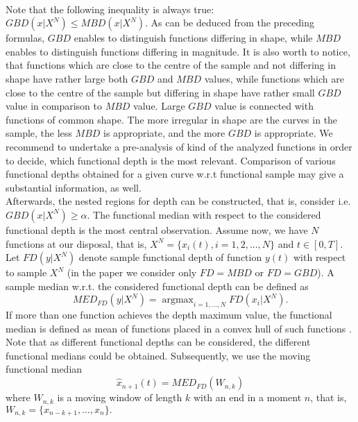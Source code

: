 \documentclass[12pt,a4paper]{article}
\numberwithin{equation}{section}
\begin{document}
\\ Note that the following inequality is always true: $GBD(x|X^N)\leq MBD(x|X^N)$. As can be deduced from the preceding formulas, $GBD$ enables to distinguish functions differing in shape, while $MBD$ enables to distinguish functions differing in magnitude. It is also worth to notice, that functions which are close to the centre of the sample and not differing in shape have rather large both $GBD$ and $MBD$ values, while functions which are close to the centre of the sample but differing in shape have rather small $GBD$ value in comparison to $MBD$ value. Large $GBD$ value is connected with functions of common shape. The more irregular in shape are the curves in the sample, the less $MBD$ is appropriate, and the more $GBD$ is appropriate. We recommend to undertake a pre-analysis of kind of the analyzed functions in order to decide, which functional depth is the most relevant. Comparison of various functional depths obtained for a given curve w.r.t functional sample may give a substantial information, as well.
\\ Afterwards, the nested regions for depth can be constructed, that is, consider i.e. $GBD(x|X^N)\geq \alpha$. The functional median with respect to the considered functional depth is the most central observation. Assume now, we have $N$ functions at our disposal, that is,  $X^N=\{x_i(t), i=1,2,...,N \}$ and $t\in [0,T].$
Let $FD(y|X^N)$ denote sample functional depth of function $y(t)$ with respect to sample $X^N$ (in the paper we consider only $FD=MBD$ or $FD=GBD$). A sample median w.r.t. the considered functional depth can be defined as 
$$MED_{FD}(y|X^N)={\mathop{\arg \max }}_{i=1,...,N} FD(x_i|X^N).$$
If more than one function achieves the depth maximum value, the functional median is defined as mean of functions placed in a convex hull of such functions \cite{Kos1}.
Note that as different functional depths can be considered, the different functional medians could be obtained.
Subsequently, we use the moving functional median  
$$\hat{x}_{n+1}(t)=MED_{FD}(W_{n,k})$$ %
where $W_{n,k}$ is a moving window of length $k$ with an end in a moment $n$, that is, $W_{n,k}=\{x_{n-k+1},...,x_n\}.$
\end{document}
